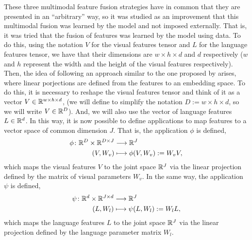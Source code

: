 These three multimodal feature fusion strategies have in common that they are
presented in an ``arbitrary'' way, so it was studied as an improvement that
this multimodal fusion was learned by the model and not imposed
externally. That is, it was tried that the fusion of features was learned by
the model using data. To do this, using the notation \(V\) for the visual
features tensor and \(L\) for the language features tensor, we have that their
dimensions are \(w \times h \times d\) and \(d\) respectively (\(w\) and \(h\)
represent the width and the height of the visual features respectively). Then,
the idea of following an approach similar to the one proposed by
 arises, where linear porjections are defined from the
features to an embedding space. To do this, it is necessary to reshape the
visual features tensor and think of it as a vector \(V \in \mathbb{R}^{w \times h
\times d}\), (we will define to simplify the notation \(D := w \times h \times
d\), so we will write \(V \in \mathbb{R}^D\)). And, we will also use the vector of
language features \(L \in \mathbb{R}^{d}\). In this way, it is now possible to define
applications to map features to a vector space of common dimension \(J\). That
is, the application \(\phi\) is defined,
\begin{equation}
  \begin{aligned}
    \phi \colon \mathbb{R}^{D} \times \mathbb{R}^{D \times J} &\longrightarrow \mathbb{R}^J \\ (V, W_v)
    &\longmapsto \phi(V, W_v) := W_v V,
  \end{aligned}
\end{equation}
which maps the visual features \(V\) to the joint space \(\mathbb{R}^J\) via the linear
projection defined by the matrix of visual parameters \(W_v\). In the same way,
the application \(\psi\) is defined,
\begin{equation}
  \begin{aligned}
    \psi \colon \mathbb{R}^{d} \times \mathbb{R}^{J \times d} &\longrightarrow \mathbb{R}^J \\ (L, W_l)
    &\longmapsto \psi(L, W_l) := W_l L,
  \end{aligned}
\end{equation}
which maps the language features \(L\) to the joint space \(\mathbb{R}^J\) via the
linear projection defined by the language parameter matrix \(W_l\).

